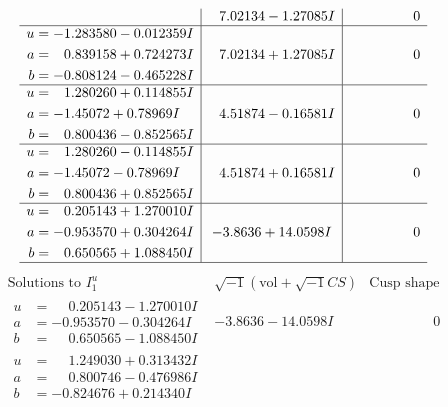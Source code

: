 \documentclass[1p]{elsarticle_modified}
\theoremstyle{definition}
\newcommand{\I}{\sqrt{-1}}
\begin{document}
$$\begin{array}{c|c|c}
 & \phantom{-}7.02134 - 1.27085 I & \phantom{-0.000000 } 0 \\ \hline\begin{aligned}
u &= -1.283580 - 0.012359 I \\
a &= \phantom{-}0.839158 + 0.724273 I \\
b &= -0.808124 - 0.465228 I\end{aligned}
 & \phantom{-}7.02134 + 1.27085 I & \phantom{-0.000000 } 0 \\ \hline\begin{aligned}
u &= \phantom{-}1.280260 + 0.114855 I \\
a &= -1.45072 + 0.78969 I \\
b &= \phantom{-}0.800436 - 0.852565 I\end{aligned}
 & \phantom{-}4.51874 - 0.16581 I & \phantom{-0.000000 } 0 \\ \hline\begin{aligned}
u &= \phantom{-}1.280260 - 0.114855 I \\
a &= -1.45072 - 0.78969 I \\
b &= \phantom{-}0.800436 + 0.852565 I\end{aligned}
 & \phantom{-}4.51874 + 0.16581 I & \phantom{-0.000000 } 0 \\ \hline\begin{aligned}
u &= \phantom{-}0.205143 + 1.270010 I \\
a &= -0.953570 + 0.304264 I \\
b &= \phantom{-}0.650565 + 1.088450 I\end{aligned}
 & -3.8636 + 14.0598 I & \phantom{-0.000000 } 0\\
 \hline 
 \end{array}$$\newpage$$\begin{array}{c|c|c}  
\text{Solutions to }I^u_{1}& \I (\text{vol} + \sqrt{-1}CS) & \text{Cusp shape}\\
 \hline 
\begin{aligned}
u &= \phantom{-}0.205143 - 1.270010 I \\
a &= -0.953570 - 0.304264 I \\
b &= \phantom{-}0.650565 - 1.088450 I\end{aligned}
 & -3.8636 - 14.0598 I & \phantom{-0.000000 } 0 \\ \hline\begin{aligned}
u &= \phantom{-}1.249030 + 0.313432 I \\
a &= \phantom{-}0.800746 - 0.476986 I \\
b &= -0.824676 + 0.214340 I\end{aligned}

\end{array}$$
\end{document}
